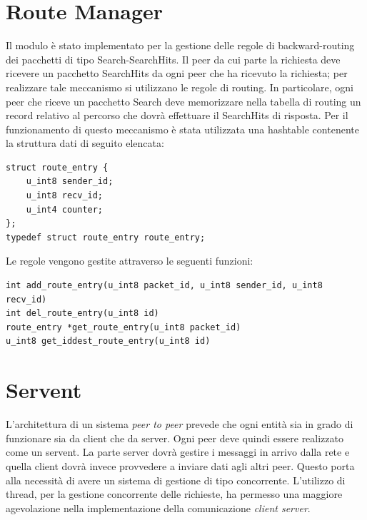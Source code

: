 \section{Route Manager}
Il modulo è stato implementato per la gestione delle regole di backward-routing dei pacchetti di tipo Search-SearchHits. Il peer da cui parte la richiesta deve ricevere un pacchetto SearchHits da ogni peer che ha ricevuto la richiesta; per realizzare tale meccanismo si utilizzano le regole di routing. In particolare, ogni peer che riceve un pacchetto Search deve memorizzare nella tabella di routing un record relativo al percorso che dovrà effettuare il SearchHits di risposta.
Per il funzionamento di questo meccanismo è stata utilizzata una hashtable contenente la struttura dati di seguito elencata:
\begin{lstlisting}[frame=trBL]
struct route_entry {
	u_int8 sender_id;
	u_int8 recv_id;
	u_int4 counter;
};
typedef struct route_entry route_entry;
\end{lstlisting}
Le regole vengono gestite attraverso le seguenti funzioni:
\begin{lstlisting}[frame=trBL]
int add_route_entry(u_int8 packet_id, u_int8 sender_id, u_int8 recv_id)
int del_route_entry(u_int8 id)
route_entry *get_route_entry(u_int8 packet_id)
u_int8 get_iddest_route_entry(u_int8 id)
\end{lstlisting}
\section{Servent}
L’architettura di un sistema \textit{peer to peer} prevede che ogni entità sia in grado di funzionare sia da client che da server. Ogni peer deve quindi essere realizzato come un servent. La parte server dovrà gestire i messaggi in arrivo dalla rete e quella client dovrà invece provvedere a inviare dati agli altri peer. Questo porta alla necessità di avere un sistema di gestione di tipo concorrente. L'utilizzo di thread, per la gestione concorrente delle richieste, 
ha permesso una maggiore agevolazione nella implementazione della comunicazione \textit{client server}.
